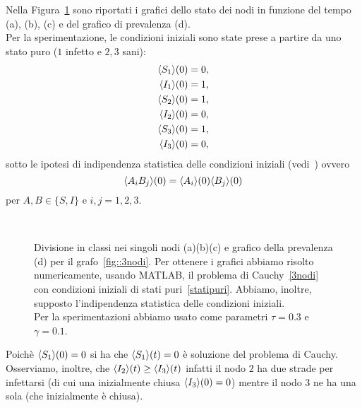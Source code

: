 Nella Figura~\ref{fig::spe3nodi} sono riportati i grafici dello stato dei nodi in funzione del tempo (a), (b), (c) e del grafico di prevalenza (d).\\
Per la sperimentazione, le condizioni iniziali sono state prese a partire da uno stato puro ($1$ infetto e $2,3$ sani):
\begin{equation}
\label{statipuri}
\begin{aligned}
\langle S_1 \rangle(0)&=0, \\
\langle I_1 \rangle(0) &=1, \\
\langle S_2 \rangle(0)&=1,\\
\langle I_2 \rangle(0)& = 0,\\ 
\langle S_3 \rangle(0)&= 1,\\
\langle I_3 \rangle(0) &= 0,\\
\end{aligned}
\end{equation}
sotto le ipotesi di indipendenza statistica delle condizioni iniziali (vedi~\cite{MR3340258}) ovvero
$$
\langle A_i B_j \rangle(0) =\langle A_i \rangle(0) \langle B_j \rangle(0)$$ 
per $A,B\in \{ S, I\}$ e  $i,j=1, 2,3$.\\

\begin{figure}[h]
	\centering
	\subfloat[][Nodo 1]{}
	\subfloat[][Nodo 2]{}
	\\
	\subfloat[][Nodo 3]{}
	\subfloat[][Prevalenza]{}
	\caption[Sperimentazione in MATLAB relativo al grafo~\ref{fig::3nodi}]{Divisione in classi nei singoli nodi (a)(b)(c) e grafico della prevalenza (d) per il grafo~\ref{fig::3nodi}.   Per ottenere i grafici abbiamo risolto numericamente,  usando MATLAB,  il problema di Cauchy~\eqref{3nodi} con condizioni iniziali  di stati puri~\eqref{statipuri}. Abbiamo,  inoltre,  supposto l'indipendenza statistica delle condizioni iniziali.\\
		Per la sperimentazioni abbiamo usato come parametri $\tau= 0.3$ e $\gamma =0.1 $.}\label{fig::spe3nodi}
\end{figure}
Poich\`e $\langle S_1 \rangle(0)=0$ si ha che $\langle S_1 \rangle(t)=0$ \`e soluzione del problema di Cauchy.  Osserviamo,  inoltre, che $\langle I_2 \rangle(t)\geq \langle I_3 \rangle(t)$ infatti il nodo $2$ ha due strade per infettarsi (di cui una inizialmente chiusa $\langle I_3 \rangle(0)=0$) mentre il nodo $3$ ne ha una sola (che inizialmente \`e chiusa). 





